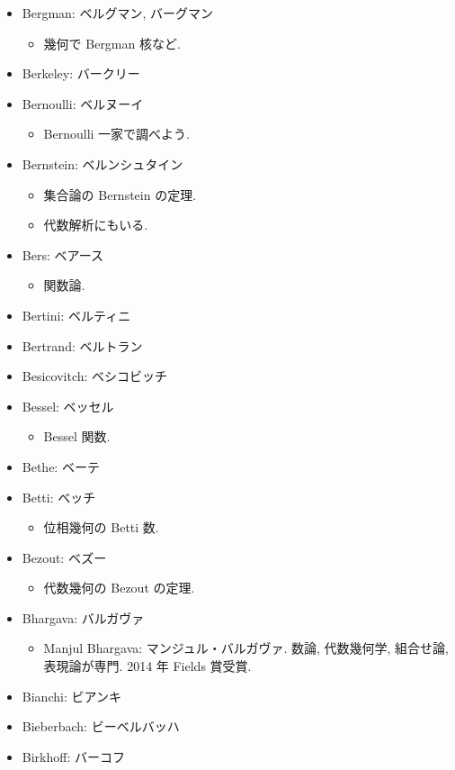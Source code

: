 \documentclass[openany, a4paper, oneside]{jsbook}
\begin{document}
\begin{itemize}
\item Bergman: ベルグマン, バーグマン
\begin{itemize}
\item 幾何で Bergman 核など.
\end{itemize}
\item Berkeley: バークリー
\item Bernoulli: ベルヌーイ
\begin{itemize}
\item Bernoulli 一家で調べよう.
\end{itemize}
\item Bernstein: ベルンシュタイン
\begin{itemize}
\item 集合論の Bernstein の定理.
\item 代数解析にもいる.
\end{itemize}
\item Bers: ベアース
\begin{itemize}
\item 関数論.
\end{itemize}
\item Bertini: ベルティニ
\item Bertrand: ベルトラン
\item Besicovitch: ベシコビッチ
\item Bessel: ベッセル
\begin{itemize}
\item Bessel 関数.
\end{itemize}
\item Bethe: ベーテ
\item Betti: ベッチ
\begin{itemize}
\item 位相幾何の Betti 数.
\end{itemize}
\item Bezout: ベズー
\begin{itemize}
\item 代数幾何の Bezout の定理.
\end{itemize}
\item Bhargava: バルガヴァ
\begin{itemize}
\item Manjul Bhargava: マンジュル・バルガヴァ. 数論, 代数幾何学, 組合せ論, 表現論が専門. 2014 年 Fields 賞受賞.
\end{itemize}
\item Bianchi: ビアンキ
\item Bieberbach: ビーベルバッハ
\item Birkhoff: バーコフ

\end{itemize}
\end{document}
